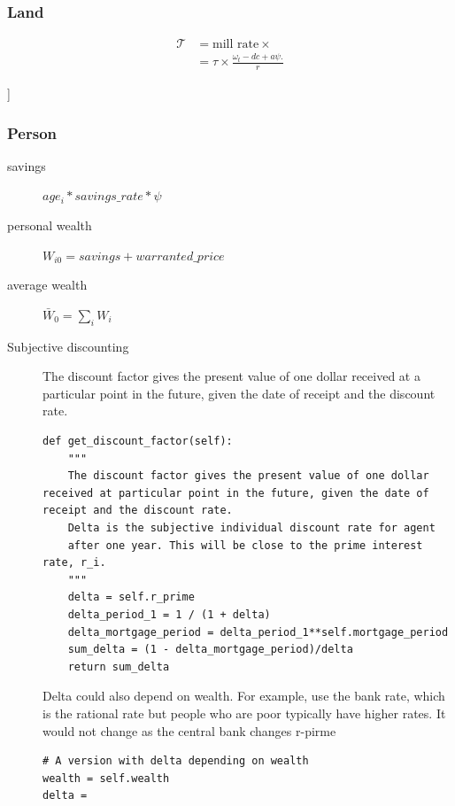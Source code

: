 \subsubsection{Land}
\begin{description}
{\color{red}
\item[property taxes]
\begin{align*}
\mathcal{T} &= \text{mill rate} \times  \\
&= \tau \times \frac{\omega_t- {dc} + a\psi.}{r}
\end{align*}
}
]
\end{description}


\subsubsection{Person}
\begin{description}
\item [savings] $age_i*savings\_rate*\psi$
\item[personal wealth] $W_{i0}= savings + warranted\_price $
\item[average wealth] $\bar W_{0}= \sum_i W_i$
\item[Subjective discounting] The discount factor gives the present value of one dollar received at a particular point in the future, given the date of receipt and the discount rate.
\begin{lstlisting}
def get_discount_factor(self):
    """
    The discount factor gives the present value of one dollar received at particular point in the future, given the date of receipt and the discount rate.
    Delta is the subjective individual discount rate for agent
    after one year. This will be close to the prime interest rate, r_i.
    """    
    delta = self.r_prime
    delta_period_1 = 1 / (1 + delta) 
    delta_mortgage_period = delta_period_1**self.mortgage_period
    sum_delta = (1 - delta_mortgage_period)/delta
    return sum_delta
\end{lstlisting}
Delta could also depend on wealth. For example,  use the bank rate, which is the rational rate but people who are poor typically have higher rates.  It would not change as the central bank changes r-pirme


\begin{lstlisting}
# A version with delta depending on wealth
wealth = self.wealth
delta =
\end{lstlisting}


\end{description}

